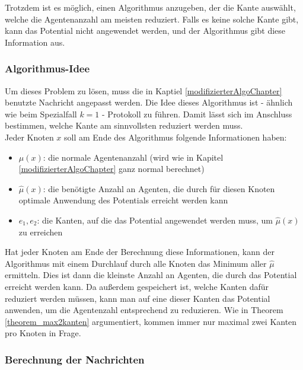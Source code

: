 Trotzdem ist es möglich, einen Algorithmus anzugeben, der die Kante auswählt, welche die Agentenanzahl am meisten reduziert. Falls es keine solche Kante gibt, kann das Potential nicht angewendet werden, und der Algorithmus gibt diese Information aus.


\subsubsection{Algorithmus-Idee}

	Um dieses Problem zu lösen, muss die in Kaptiel \ref{modifizierterAlgoChapter} benutzte Nachricht angepasst werden. Die Idee dieses Algorithmus ist - ähnlich wie beim Spezialfall $k = 1$ -  Protokoll zu führen. Damit lässt sich im Anschluss bestimmen, welche Kante am sinnvollsten reduziert werden muss.\\
	Jeder Knoten $x$ soll am Ende des Algorithmus folgende Informationen haben:
	\begin{itemize}
		\item $\mu(x)$: die normale Agentenanzahl (wird wie in Kapitel \ref{modifizierterAlgoChapter} ganz normal berechnet)
		\item $\hat{\mu}(x)$: die benötigte Anzahl an Agenten, die durch für diesen Knoten optimale Anwendung des Potentials erreicht werden kann
		\item $e_{1}, e_{2}$: die Kanten, auf die das Potential angewendet werden muss, um $\hat{\mu}(x)$ zu erreichen
	\end{itemize}
	Hat jeder Knoten am Ende der Berechnung diese Informationen, kann der Algorithmus mit einem Durchlauf durch alle Knoten das Minimum aller $\hat{\mu}$ ermitteln. Dies ist dann die kleinste Anzahl an Agenten, die durch das Potential erreicht werden kann. Da außerdem gespeichert ist, welche Kanten dafür reduziert werden müssen, kann man auf eine dieser Kanten das Potential anwenden, um die Agentenzahl entsprechend zu reduzieren. Wie in Theorem \ref{theorem_max2kanten} argumentiert, kommen immer nur maximal zwei Kanten pro Knoten in Frage.
	
	
	\subsubsection{Berechnung der Nachrichten}
	

